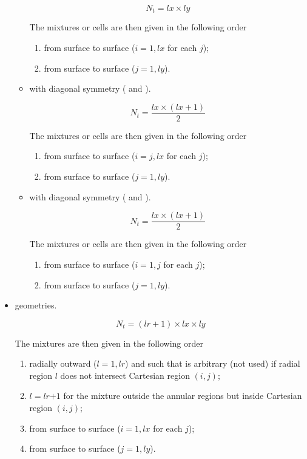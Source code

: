 \begin{itemize}
\begin{itemize}
$$N_{t}=\textit{lx}\times \textit{ly}$$

The mixtures or cells are then given in the following order
\begin{enumerate}
\item from surface  to surface  ($i=1,\textit{lx}$ for each $j$);
\item from surface  to surface  ($j=1,\textit{ly}$).
\end{enumerate}

\item with diagonal symmetry ( and ). 

$$N_{t}=\frac{\textit{lx}\times (\textit{lx}+1)}{2}$$

The mixtures or cells are then given in the following order
\begin{enumerate}
\item from surface  to surface  ($i=j,\textit{lx}$ for each $j$);
\item from surface  to surface  ($j=1,\textit{ly}$).
\end{enumerate}

\item with diagonal symmetry ( and ). 

$$N_{t}=\frac{\textit{lx}\times (\textit{lx}+1)}{2}$$

The mixtures or cells are then given in the following order
\begin{enumerate}
\item from surface  to surface  ($i=1,j$ for each $j$);
\item from surface  to surface  ($j=1,\textit{ly}$).
\end{enumerate}
\end{itemize}

\item {} geometries.

$$N_{t}=(\textit{lr}+1)\times\textit{lx}\times \textit{ly} $$

The mixtures are then given in the following order
\begin{enumerate}
\item radially outward ($l=1,\textit{lr}$) and such that  is arbitrary (not used) if radial region $l$ does not intersect Cartesian region $(i,j)$;
\item $l=\textit{lr+1}$ for the mixture outside the annular regions but inside Cartesian region $(i,j)$;
\item from surface  to surface  ($i=1,\textit{lx}$ for each $j$);
\item from surface  to surface  ($j=1,\textit{ly}$).
\end{enumerate}


\end{itemize}
